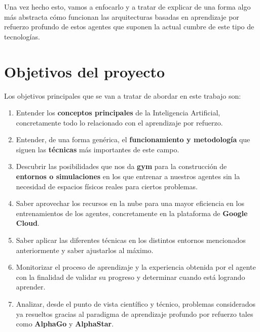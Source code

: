 \documentclass[11pt,fleqn]{book} %
\begin{document}
Una vez hecho esto, vamos a enfocarlo y a tratar de explicar de una forma algo más abstracta cómo funcionan las arquitecturas basadas en aprendizaje por refuerzo profundo de estos agentes que suponen la actual cumbre de este tipo de tecnologías. \\

\section{Objetivos del proyecto}\label{sec:objetivos}

Los objetivos principales que se van a tratar de abordar en este trabajo son: \\

\begin{enumerate}
	\item Entender los \textbf{conceptos principales} de la Inteligencia Artificial, concretamente todo lo relacionado con el aprendizaje por refuerzo. \\
	
	\item Entender, de una forma genérica, el \textbf{funcionamiento y metodología} que siguen las \textbf{técnicas} más importantes de este campo. \\
	
	\item Descubrir las posibilidades que nos da \textbf{gym} \cite{article:gym} para la construcción de \textbf{entornos o simulaciones} en los que entrenar a nuestros agentes sin la necesidad de espacios físicos reales para ciertos problemas. \\
	
	\item Saber aprovechar los recursos en la nube para una mayor eficiencia en los entrenamientos de los agentes, concretamente en la plataforma de \textbf{Google Cloud}. \\
	
	\item Saber aplicar las diferentes técnicas en los distintos entornos mencionados anteriormente y saber ajustarlos al máximo. \\
	
	\item Monitorizar el proceso de aprendizaje y la experiencia obtenida por el agente con la finalidad de validar su progreso y determinar cuando está logrando aprender. \\
	
	\item Analizar, desde el punto de vista científico y técnico, problemas considerados ya resueltos gracias al paradigma de aprendizaje profundo por refuerzo tales como \textbf{AlphaGo} y \textbf{AlphaStar}. \\
	

\end{enumerate}
\end{document}
